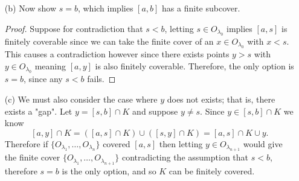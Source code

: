 \begin{enumerate}
    \item[(b)] Now show \( s = b  \), which implies \( [a,b] \) has a finite subcover.
        \begin{proof}
            Suppose for contradiction that \( s < b  \), letting \( s \in O_{\lambda_0} \) implies \( [a,s] \) is finitely coverable since we can take the finite cover of an \( x \in O_{\lambda_0} \) with \( x < s  \). This causes a contradiction however since there exists points \( y > s  \) with \( y \in O_{\lambda_0} \) meaning \( [a,y] \) is also finitely coverable. Therefore, the only option is \( s = b  \), since any \( s < b  \) fails.
    \end{proof}
\item[(c)] We must also consider the case where \( y \) does not exists; that is, there exists a "gap". Let \(  y = [s,b] \cap K  \) and suppose \( y \neq s  \). Since \(  y \in [s,b] \cap K \) we know 
    \[ [a,y] \cap K = ([a,s] \cap K ) \cup ([s,y] \cap K) = [a,s] \cap K \cup {y}. \]
    Therefore if \( \{ O_{\lambda_1}, \dots, O_{\lambda_{n}} \}  \) covered \( [a,s] \) then letting \( y \in O_{\lambda_{n+1}} \) would give the finite cover \( \{ O_{\lambda_1}, \dots, O_{\lambda_{n+1}}\}  \) contradicting the assumption that \( s < b  \), therefore \( s = b  \) is the only option, and so \( K \) can be finitely covered.
\end{enumerate}




